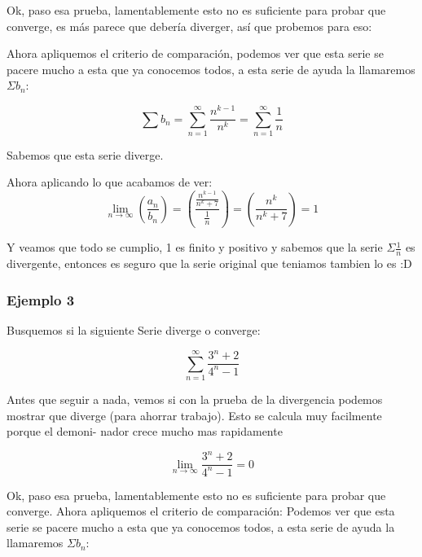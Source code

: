 \documentclass[12pt]{report}                                %
\begin{document}
            Ok, paso esa prueba, lamentablemente esto no es suficiente para probar que converge, es más parece que debería diverger, así que probemos para eso:

            Ahora apliquemos el criterio de comparación, podemos ver que esta serie se pacere mucho a esta que ya conocemos todos, a esta serie de ayuda la llamaremos $\Sigma b_n$:

            \begin{equation*}
                \sum b_n = \sum_{n=1}^{\infty} \frac{n^{k-1}}{n^k} = \sum_{n=1}^{\infty} \frac{1}{n}
            \end{equation*}

            Sabemos que esta serie diverge.

            Ahora aplicando lo que acabamos de ver:
            \begin{equation*}
                \lim_{n \to \infty} \left( \frac{a_n}{b_n} \right) = \left( \frac{ \frac{n^{k-1}}{n^k+7} }{ \frac{1}{n} } \right) =  \left( \frac{n^k}{n^k+7} \right) = 1
            \end{equation*}

            Y veamos que todo se cumplio, 1 es finito y positivo y sabemos que la serie $\Sigma \frac{1}{n}$ es divergente, entonces es seguro que la serie original que teniamos tambien lo es :D


        \subsubsection{Ejemplo 3}
            Busquemos si la siguiente Serie diverge o converge:

            \begin{equation*}
                \sum_{n=1}^{\infty} \frac{3^n+2}{4^n-1}
            \end{equation*}

            Antes que seguir a nada, vemos si con la prueba de la divergencia podemos mostrar que diverge (para ahorrar trabajo). Esto se calcula muy facilmente porque el demoni- nador crece mucho mas rapidamente

            \begin{equation*}
                \lim_{n \to \infty}  \frac{3^n+2}{4^n-1} = 0
            \end{equation*}


            Ok, paso esa prueba, lamentablemente esto no es
            suficiente para probar que converge.
            Ahora apliquemos el criterio de comparación: Podemos ver que esta serie se pacere mucho a esta que ya conocemos todos, a esta serie de ayuda la llamaremos $\Sigma b_n$:
\end{document}

